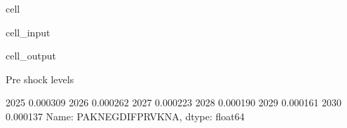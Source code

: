 \documentclass[letterpaper,10pt,english]{jupyterBook}
\begin{document}
\begin{sphinxuseclass}{cell}\begin{sphinxVerbatimInput}

\begin{sphinxuseclass}{cell_input}
\begin{sphinxVerbatim}[commandchars=\\\{\}]

\PYG{p}{[}\PYG{p}{]}\PYG{p}{[}\PYG{p}{]}


\PYG{p}{[}\PYG{p}{]}
\end{sphinxVerbatim}

\end{sphinxuseclass}\end{sphinxVerbatimInput}
\begin{sphinxVerbatimOutput}

\begin{sphinxuseclass}{cell_output}
\begin{sphinxVerbatim}[commandchars=\\\{\}]
Pre shock levels
\end{sphinxVerbatim}

\begin{sphinxVerbatim}[commandchars=\\\{\}]
2025   \PYGZhy{}0.000309
2026   \PYGZhy{}0.000262
2027   \PYGZhy{}0.000223
2028   \PYGZhy{}0.000190
2029   \PYGZhy{}0.000161
2030   \PYGZhy{}0.000137
Name: PAKNEGDIFPRVKN\PYGZus{}A, dtype: float64
\end{sphinxVerbatim}

\end{sphinxuseclass}\end{sphinxVerbatimOutput}

\end{sphinxuseclass}
\end{document}
